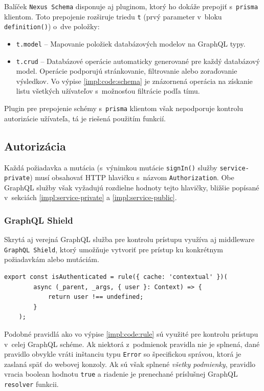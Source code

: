 \noindent Balíček \texttt{Nexus Schema} disponuje aj pluginom, ktorý ho dokáže prepojiť s~\texttt{prisma} klientom. Toto prepojenie rozširuje triedu \texttt{t} (prvý parameter v~bloku \texttt{definition()}) o~dve položky:

\begin{itemize}
	\item \texttt{t.model} -- Mapovanie položiek databázových modelov na GraphQL typy.
	\item \texttt{t.crud} -- Databázové operácie automaticky generované pre každý databázový model. Operácie podporujú stránkovanie, filtrovanie alebo zoraďovanie výsledkov. Vo výpise \ref{impl:code:schema} je znázornená operácia na získanie listu všetkých užívateľov s~možnosťou filtrácie podľa tímu.
\end{itemize}

\noindent Plugin pre prepojenie schémy s~\texttt{prisma} klientom však nepodporuje kontrolu autorizácie užívateľa, tá je riešená použitím  funkcií.

\subsection{Autorizácia}
Každá požiadavka a mutácia (s~výnimkou mutácie \texttt{signIn()} služby \texttt{service-private}) musí obsahovať HTTP hlavičku s~názvom \texttt{Authorization}. Obe GraphQL služby však vyžadujú rozdielne hodnoty tejto hlavičky, bližšie popísané v~sekciách \ref{impl:service-private} a \ref{impl:service-public}.

\subsubsection{GraphQL Shield}
Skrytá aj verejná GraphQL služba pre kontrolu prístupu využíva aj middleware \texttt{GraphQL Shield}, ktorý umožňuje vytvoriť  pre prístup ku konkrétnym požiadavkám alebo mutáciám. \\

\begin{lstlisting}[caption={Pravidlo \texttt{GraphQL Shield} kontrolujúce či je užívateľ autentifikovaný.}, label={impl:code:rule}]
	export const isAuthenticated = rule({ cache: 'contextual' })(
		async (_parent, _args, { user }: Context) => {
			return user !== undefined;
		}
	);
\end{lstlisting}

\medskip

\noindent Podobné pravidlá ako vo výpise \ref{impl:code:rule} sú využité pre kontrolu prístupu v~celej GraphQL schéme. Ak niektorá z~podmienok pravidla nie je splnená, dané pravidlo obvykle vráti inštanciu typu \texttt{Error} so špecifickou správou, ktorá je zaslaná späť do webovej konzoly. Ak sú však splnené \emph{všetky podmienky}, pravidlo vracia boolean hodnotu \texttt{true} a riadenie je prenechané príslušnej GraphQL \texttt{resolver} funkcii.

